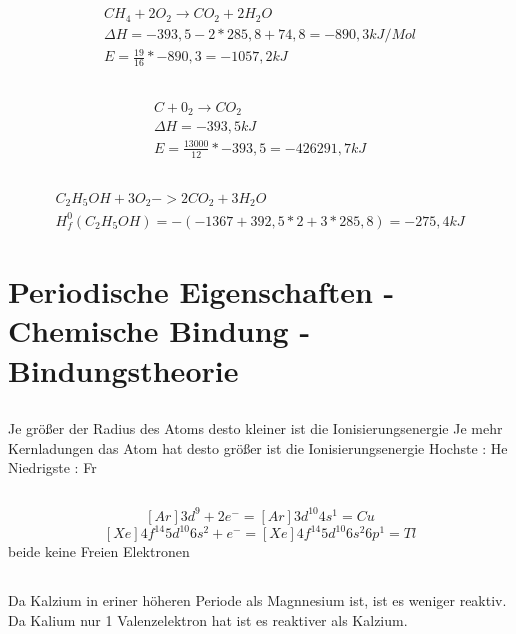 \documentclass[a4paper]{article}
\begin{document}
\subsection{}
\begin{align}
  CH_4 + 2 O_2 \rightarrow CO_2 + 2 H_2O\\
  \Delta H = -393,5 -2*285,8+74,8 = -890,3 kJ/Mol\\
  E = \frac{19}{16}*-890,3 = -1057,2kJ
\end{align}

\subsection{}
\begin{align}
  C + 0_2 \rightarrow CO_2\\
  \Delta H = -393,5kJ\\
  E = \frac{13000}{12}*-393,5=-426291,7kJ
\end{align}

\subsection{}
\begin{align}
  C_2H_5OH + 3 O_2 -> 2 CO_2 + 3 H_2O\\
  H^0_f(C_2H_5OH)=-(-1367+392,5*2+3*285,8)=-275,4kJ
\end{align}

\section{Periodische Eigenschaften - Chemische Bindung - Bindungstheorie}
\subsection{}
Je größer der Radius des Atoms desto kleiner ist die Ionisierungsenergie
Je mehr Kernladungen das Atom hat desto größer ist die Ionisierungsenergie
Hochste : He
Niedrigste : Fr

\subsection{}
\[[Ar]3d^9 +2e^- = [Ar]3d^{10}4s^1 = Cu\]
\[[Xe]4f^{14}5d^{10}6s^{2} + e^- = [Xe]4f^{14}5d^{10}6s^{2}6p^1 = Tl\]
beide keine Freien Elektronen 

\subsection{}
  Da Kalzium in eriner höheren Periode als Magnnesium ist, ist es weniger reaktiv.
  Da Kalium nur 1 Valenzelektron hat ist es reaktiver als Kalzium.
\end{document}
